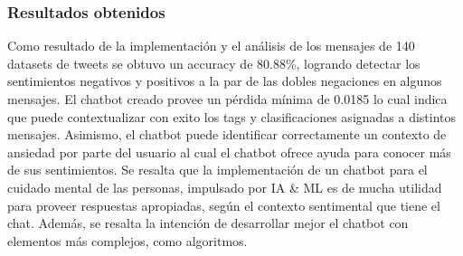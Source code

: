 \subsubsection{Resultados obtenidos}
Como resultado de la implementación y el análisis de los mensajes de 140 datasets de tweets se obtuvo un accuracy de 80.88\%, logrando detectar los sentimientos negativos y positivos a la par de las dobles negaciones en algunos mensajes. El chatbot creado provee un pérdida mínima de 0.0185 lo cual indica que puede contextualizar con exito los tags y clasificaciones asignadas a distintos mensajes. Asimismo, el chatbot puede identificar correctamente un contexto de ansiedad por parte del usuario al cual el chatbot ofrece ayuda para conocer más de sus sentimientos.
Se resalta que la implementación de un chatbot para el cuidado mental de las personas, impulsado por IA \& ML es de mucha utilidad para proveer respuestas apropiadas, según el contexto sentimental que tiene el chat. Además, se resalta la intención de desarrollar mejor el chatbot con elementos más complejos, como algoritmos.






